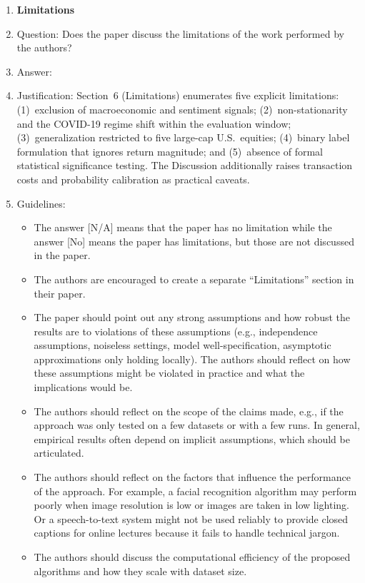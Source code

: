 \documentclass{article}
\begin{document}
\begin{enumerate}
\item {\bf Limitations}
    \item[] Question: Does the paper discuss the limitations of the work performed by the authors?
    \item[] Answer: \answerYes{}
    \item[] Justification: Section~6 (Limitations) enumerates five explicit limitations:
    (1)~exclusion of macroeconomic and sentiment signals; (2)~non-stationarity and the
    COVID-19 regime shift within the evaluation window; (3)~generalization restricted to five
    large-cap U.S.\ equities; (4)~binary label formulation that ignores return magnitude; and
    (5)~absence of formal statistical significance testing. The Discussion additionally raises
    transaction costs and probability calibration as practical caveats.
    \item[] Guidelines:
    \begin{itemize}
        \item The answer [N/A] means that the paper has no limitation while the answer [No] means
the paper has limitations, but those are not discussed in the paper.
        \item The authors are encouraged to create a separate ``Limitations'' section in their paper.
        \item The paper should point out any strong assumptions and how robust the results are to
violations of these assumptions (e.g., independence assumptions, noiseless settings,
model well-specification, asymptotic approximations only holding locally). The authors
should reflect on how these assumptions might be violated in practice and what the
implications would be.
        \item The authors should reflect on the scope of the claims made, e.g., if the approach was
only tested on a few datasets or with a few runs. In general, empirical results often
depend on implicit assumptions, which should be articulated.
        \item The authors should reflect on the factors that influence the performance of the approach.
For example, a facial recognition algorithm may perform poorly when image resolution
is low or images are taken in low lighting. Or a speech-to-text system might not be
used reliably to provide closed captions for online lectures because it fails to handle
technical jargon.
        \item The authors should discuss the computational efficiency of the proposed algorithms
and how they scale with dataset size.

\end{itemize}
\end{enumerate}
\end{document}
